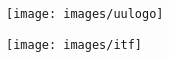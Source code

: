\documentclass[thesis]{subfiles}
\begin{document}

\begin{titlepage} %

	\noindent
	\begin{minipage}{0.5\textwidth}
		\texttt{[image: images/uulogo]} %
	\end{minipage}
	\hfill
    \begin{minipage}{0.2\textwidth}\raggedleft
		\texttt{[image: images/itf]} %
	\end{minipage}
    
    \par\vspace{1cm}
    

\end{titlepage}
\end{document}
